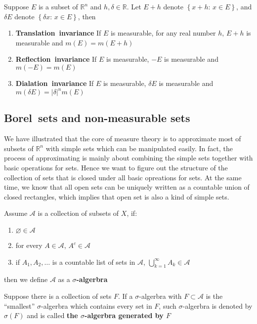 \documentclass{ctexbook}
\begin{document}
\begin{thm}
    Suppose $E$ is a subset of $\mathbb{R}^n $ and $h,\delta \in \mathbb{R}$. Let $E+h$ denote $\left\{x+h:\, x\in E\right\}$, and
    $\delta E$ denote $\left\{\delta x:\, x\in E\right\} $, then
    \begin{enumerate}
        \item \textbf{Translation~invariance} If $E$ is measurable, for any real number $h$, $E+h$ is measurable and $m(E) = m(E+h)$
        \item \textbf{Reflection~invariance} If $E$ is measurable, $-E$ is measurable and $m(-E) = m(E)$
        \item \textbf{Dialation~invariance} If $E$ is measurable, $\delta E$ is measurable and $m(\delta E) = \left\lvert\delta \right\rvert^nm(E)$
    \end{enumerate}
\end{thm}

\subsection*{Borel~sets and non-measurable sets}

We have illustrated that the core of measure theory is to approximate most of subsets of $\mathbb{R}^n$ with simple sets which
can be manipulated easily. In fact, the process of approximating is mainly about combining the simple sets together with basic
operations for sets. Hence we want to figure out the structure of the collection of sets that is closed under all basic opreations
for sets. At the same time, we know that all open sets can be uniquely written as a countable union of closed rectangles, which
implies that open set is also a kind of simple sets.    

\begin{define}
    Assume $\mathscr{A}$ is a collection of subsets of $X$, if:
    \begin{enumerate}
        \item $\varnothing \in \mathscr{A}$
        \item for every $A \in \mathscr{A}$, $A^c \in \mathscr{A}$
        \item if $A_1,A_2,\ldots$ is a countable list of sets in $\mathscr{A}$, $\bigcup\limits_{k=1}^\infty A_k \in \mathscr{A}$
    \end{enumerate}
    then we define $\mathscr{A}$ as a \textbf{$\sigma$-algerbra}

    Suppose there is a collection of sets $F$. If a $\sigma$-algerbra with $F \subset \mathscr{A}$ is the ``smallest'' $\sigma$-algerbra
    which contains every set in $F$, such $\sigma$-algerbra is denoted by $\sigma(F)$ and is called \textbf{the $\sigma$-algerbra generated by $F$} 
\end{define}
\end{document}
